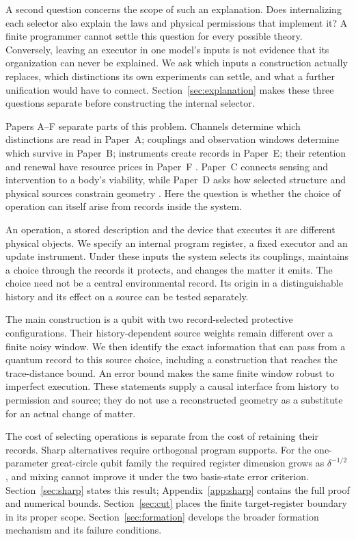 \documentclass[12pt,a4paper]{article}
\begin{document}
A second question concerns the scope of such an explanation. Does
internalizing each selector also explain the laws and physical permissions
that implement it? A finite programmer cannot settle this question for
every possible theory. Conversely, leaving an executor in one model's
inputs is not evidence that its organization can never be explained.
We ask which inputs a construction actually replaces, which distinctions
its own experiments can settle, and what a further unification would
have to connect. Section~\ref{sec:explanation} makes these three questions
separate before constructing the internal selector.

Papers A--F separate parts of this problem. Channels determine which distinctions are read in Paper~A; couplings and observation windows determine which survive in Paper~B; instruments create records in Paper~E; their retention and renewal have resource prices in Paper~F \cite{Liu2026PaperA,Liu2026PaperB,Liu2026PaperE,Liu2026PaperF}. Paper~C connects sensing and intervention to a body's viability, while Paper~D asks how selected structure and physical sources constrain geometry \cite{Liu2026PaperC,Liu2026PaperD}. Here the question is whether the choice of operation can itself arise from records inside the system.

An operation, a stored description and the device that executes it are different physical objects. We specify an internal program register, a fixed executor and an update instrument. Under these inputs the system selects its couplings, maintains a choice through the records it protects, and changes the matter it emits. The choice need not be a central environmental record. Its origin in a distinguishable history and its effect on a source can be tested separately.

The main construction is a qubit with two record-selected protective configurations. Their history-dependent source weights remain different over a finite noisy window. We then identify the exact information that can pass from a quantum record to this source choice, including a construction that reaches the trace-distance bound. An error bound makes the same finite window robust to imperfect execution. These statements supply a causal interface from history to permission and source; they do not use a reconstructed geometry as a substitute for an actual change of matter.

The cost of selecting operations is separate from the cost of retaining their records. Sharp alternatives require orthogonal program supports. For the one-parameter great-circle qubit family the required register dimension grows as $\delta^{-1/2}$, and mixing cannot improve it under the two basis-state error criterion. Section~\ref{sec:sharp} states this result; Appendix~\ref{app:sharp} contains the full proof and numerical bounds. Section~\ref{sec:cut} places the finite target-register boundary in its proper scope. Section~\ref{sec:formation} develops the broader formation mechanism and its failure conditions.
\end{document}
